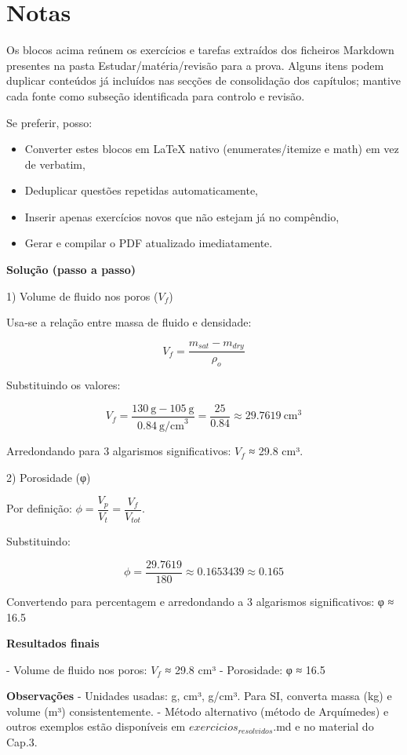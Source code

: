 \documentclass[11pt,a4paper]{article}
\begin{document}
\clearpage
\section*{Notas}
Os blocos acima reúnem os exercícios e tarefas extraídos dos ficheiros Markdown presentes na pasta Estudar/matéria/revisão para a prova. Alguns itens podem duplicar conteúdos já incluídos nas secções de consolidação dos capítulos; mantive cada fonte como subseção identificada para controlo e revisão.

Se preferir, posso:
\begin{itemize}
\item Converter estes blocos em LaTeX nativo (enumerates/itemize e math) em vez de verbatim,
\item Deduplicar questões repetidas automaticamente,
\item Inserir apenas exercícios novos que não estejam já no compêndio,
\item Gerar e compilar o PDF atualizado imediatamente.
\end{itemize}
 

\clearpage

\textbf{Solução (passo a passo)}

1) Volume de fluido nos poros ($V_{f}$)

Usa‑se a relação entre massa de fluido e densidade:

\[ V_f = \frac{m_{sat} - m_{dry}}{\rho_o} \]

Substituindo os valores:

\[ V_f = \frac{130\ \text{g} - 105\ \text{g}}{0.84\ \text{g/cm}^3} = \frac{25}{0.84} \approx 29.7619\ \text{cm}^3 \]

Arredondando para 3 algarismos significativos: $V_{f}$ ≈ 29.8 cm³.

2) Porosidade (φ)

Por definição: $ \phi = \dfrac{V_p}{V_t} = \dfrac{V_f}{V_{tot}} $.

Substituindo:

\[ \phi = \dfrac{29.7619}{180} \approx 0.1653439 \approx 0.165 \]

Convertendo para percentagem e arredondando a 3 algarismos significativos: φ ≈ 16.5 %


\textbf{Resultados finais}

- Volume de fluido nos poros: $V_{f}$ ≈ 29.8 cm³
- Porosidade: φ ≈ 16.5 %

\textbf{Observações}
- Unidades usadas: g, cm³, g/cm³. Para SI, converta massa (kg) e volume (m³) consistentemente.  
- Método alternativo (método de Arquímedes) e outros exemplos estão disponíveis em $exercicios_{resolvidos}$.md e no material do Cap.3.
\end{document}

